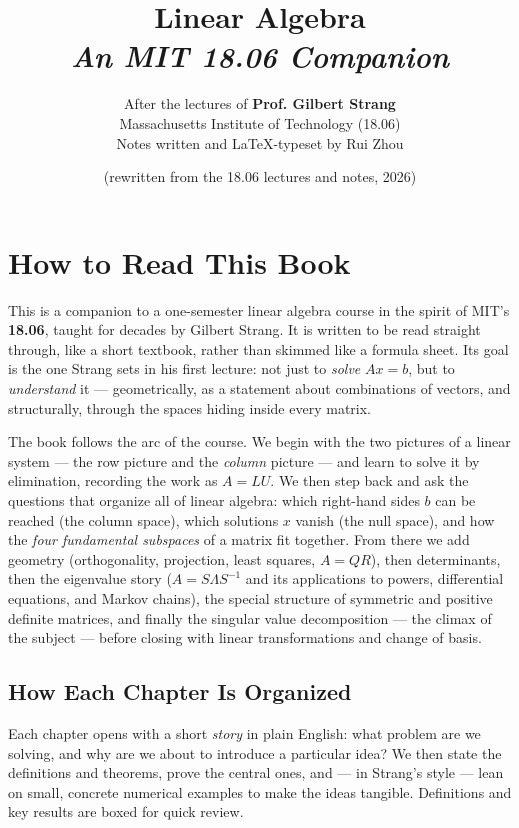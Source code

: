 \documentclass[oneside]{book}
\def\notetitle{Linear Algebra}
\def\notesubtitle{An MIT 18.06 Companion}
\def\noteauthor{After the lectures of \textbf{Prof. Gilbert Strang} \\
    Massachusetts Institute of Technology (18.06) \\
    \vspace{0.5em}
    Notes written and {\LaTeX}-typeset by Rui Zhou}
\def\notedate{\small (rewritten from the 18.06 lectures and notes, 2026)}
\begin{document}
\title{\textbf{
    \LARGE{\notetitle}\\
    \vspace{0.5em}
    \large\textit{\notesubtitle}
    \vspace*{8\baselineskip}}
}
\author{\noteauthor}
\date{\notedate}

\maketitle
\newpage

\thispagestyle{empty}
\section*{How to Read This Book}

This is a companion to a one-semester linear algebra course in the spirit of MIT's \textbf{18.06}, taught for decades by Gilbert Strang. It is written to be read straight through, like a short textbook, rather than skimmed like a formula sheet. Its goal is the one Strang sets in his first lecture: not just to \emph{solve} $Ax=b$, but to \emph{understand} it --- geometrically, as a statement about combinations of vectors, and structurally, through the spaces hiding inside every matrix.

The book follows the arc of the course. We begin with the two pictures of a linear system --- the row picture and the \emph{column} picture --- and learn to solve it by elimination, recording the work as $A=LU$. We then step back and ask the questions that organize all of linear algebra: which right-hand sides $b$ can be reached (the column space), which solutions $x$ vanish (the null space), and how the \emph{four fundamental subspaces} of a matrix fit together. From there we add geometry (orthogonality, projection, least squares, $A=QR$), then determinants, then the eigenvalue story ($A = S\Lambda S^{-1}$ and its applications to powers, differential equations, and Markov chains), the special structure of symmetric and positive definite matrices, and finally the singular value decomposition --- the climax of the subject --- before closing with linear transformations and change of basis.

\subsection*{How Each Chapter Is Organized}

Each chapter opens with a short \emph{story} in plain English: what problem are we solving, and why are we about to introduce a particular idea? We then state the definitions and theorems, prove the central ones, and --- in Strang's style --- lean on small, concrete numerical examples to make the ideas tangible. Definitions and key results are boxed for quick review.
\end{document}
